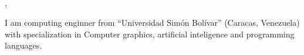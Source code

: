 \documentclass[11pt,a4paper,roman]{moderncv}
\begin{document}


\makeatletter
{}
\pagestyle{empty}

\chapter*{\@firstname~~}{\@familyname}

\vspace*{40mm}
\begin{minipage}{\textwidth}
	\\[3mm]
	\\
	\@addressstreet, \@addresscity ~~~ \mobilesymbol~\@mobile ~~~ \emailsymbol~\@email
\end{minipage}
\begin{minipage}{70pt}

\vspace*{10mm}

\end{minipage}

I am computing enginner from ``Universidad Simón Bolívar'' (Caracas, Venezuela) with specialization in Computer graphics, artificial inteligence and programming languages.
\end{document}
